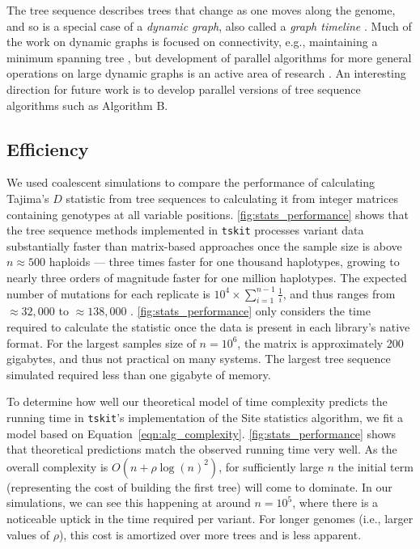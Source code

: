 \documentclass{article}
\newcommand{\tskit}{{\texttt{tskit}}}
\begin{document}
The tree sequence describes trees that change as one moves along the genome,
and so is a special case of a \emph{dynamic graph},
also called a \emph{graph timeline} \citep{lacki2013reachability}.
Much of the work on dynamic graphs is focused on connectivity,
e.g., maintaining a minimum spanning tree \citep{eppstein1994offline, eppstein1997sparsification, holm2001polylogarithmic},
but development of parallel algorithms for more general operations on large dynamic graphs
is an active area of research \citep[e.g.,][]{srinivasan2018sharedmemory}.
An interesting direction for future work is to develop
parallel versions of tree sequence algorithms such as Algorithm B.

\subsection*{Efficiency}

We used coalescent simulations to compare the performance of calculating Tajima's \citeyearpar{Tajima1989-de} $D$
statistic from tree sequences to calculating it from integer matrices containing genotypes at all variable positions.
\autoref{fig:stats_performance} shows that the tree sequence methods implemented in \texttt{tskit} processes variant data
substantially faster than matrix-based approaches once the sample size is above $n \approx 500$ haploids ---
three times faster for one thousand haplotypes,
growing to nearly three orders of magnitude faster for one million haplotypes.
The expected number of mutations for each replicate is $10^4 \times \sum_{i=1}^{n-1}\frac{1}{i}$, and thus ranges from
$\approx 32,000$ to $\approx 138,000$ \citep{Watterson1975-ej}.
\autoref{fig:stats_performance} only considers the time required to calculate the statistic
once the data is present in each library's native format.
For the largest samples size of $n=10^6$,
the matrix is approximately 200 gigabytes, and thus not practical on many systems.
The largest tree sequence simulated required less than one gigabyte of memory.

To determine how well our theoretical model of time complexity predicts the
running time in \tskit{}'s implementation of the Site statistics algorithm,
we fit a model based on Equation~\eqref{eqn:alg_complexity}.
\autoref{fig:stats_performance} shows that theoretical predictions match
the observed running time very well. As the overall complexity is
$O(n + \rho \log(n)^2)$, for sufficiently large $n$ the initial term
(representing the cost of building the first tree) will come to dominate.
In our simulations, we can see this happening at around $n = 10^5$, where there
is a noticeable uptick in the time required per variant. For
longer genomes (i.e., larger values of $\rho$), this cost is amortized over more trees
and is less apparent.
\end{document}
